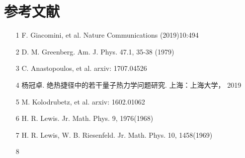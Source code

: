 \documentclass[a4paper]{article}
\begin{document}
    \section*{参考文献}
    \begin{itemize}
        \item[1] F. Giacomini, et al. Nature Communications (2019)10:494
        \item[2] D. M. Greenberg. Am. J. Phys. 47.1, 35-38 (1979)
        \item[3] C. Anastopoulos, et al. arxiv: 1707.04526
        \item[4] 杨冠卓. 绝热捷径中的若干量子热力学问题研究. 上海：上海大学， 2019
        \item[5] M. Kolodrubetz, et al. arxiv: 1602.01062
        \item[6] H. R. Lewis. Jr. Math. Phys. 9, 1976(1968) 
        \item[7] H. R. Lewis, W. B. Riesenfeld. Jr. Math. Phys. 10, 1458(1969)
        \item[8] 
    \end{itemize}
\end{document}
